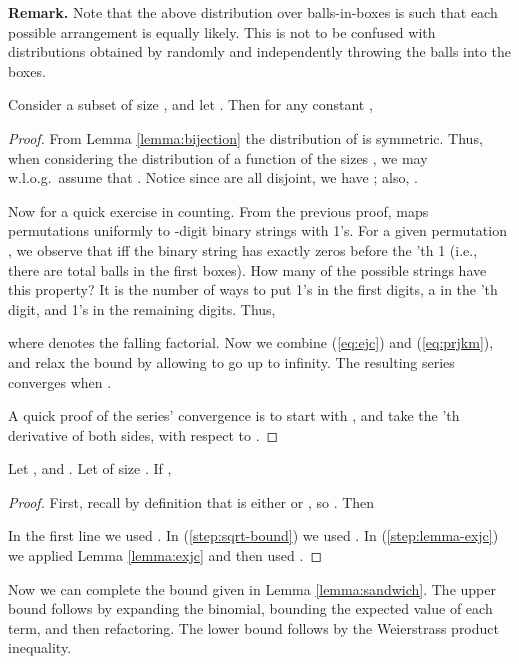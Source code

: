 \smallskip \noindent \textbf{Remark.} Note that the above distribution over balls-in-boxes is such that each possible arrangement is equally likely. This is not to be confused with distributions obtained by randomly and independently throwing the balls into the boxes. 

\begin{lemma}\label{lemma:exjc}
 Consider a subset  of size , and let . Then for any constant ,

\end{lemma}
\begin{proof}
From Lemma \ref{lemma:bijection} the distribution of  is symmetric. Thus, when considering the distribution of a function of the sizes , we may w.l.o.g.\ assume that . Notice since  are all disjoint, we have ; also, .

Now for a quick exercise in counting. From the previous proof,  maps permutations uniformly to -digit binary strings with  1's. For a given permutation , we observe that  iff the binary string  has exactly  zeros before the 'th 1 (i.e., there are  total balls in the first  boxes). How many of the  possible strings have this property? It is the number of ways to put  1's in the first  digits, a  in the 'th digit, and  1's in the remaining  digits. Thus,

where  denotes the falling factorial. Now we combine (\ref{eq:ejc}) and (\ref{eq:prjkm}), and relax the bound by allowing  to go up to infinity. The resulting series converges when .

A quick proof of the series' convergence is to start with , and take the 'th derivative of both sides, with respect to .
\end{proof}

\begin{lemma}\label{lemma:exprod}
Let , and . Let  of size . If , 

\end{lemma}

\begin{proof} First, recall by definition that  is either  or , so . Then

In the first line we used . In (\ref{step:sqrt-bound}) we used . In (\ref{step:lemma-exjc}) we applied Lemma \ref{lemma:exjc} and then used .
\end{proof}
Now we can complete the bound given in Lemma \ref{lemma:sandwich}. The upper bound follows by expanding the binomial, bounding the expected value of each term, and then refactoring. The lower bound follows by the Weierstrass product inequality.




